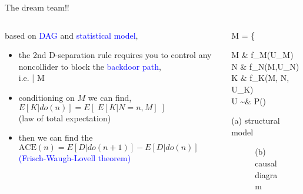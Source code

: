 %
%
\begin{frame}
	{The dream team!!}
	\begin{columns}
		\begin{column}{0.5\textwidth}
			based on \textcolor{blue}{DAG} and \textcolor{blue}{statistical model},
			\begin{itemize}
				\item the 2nd D-separation rule requires you to control any noncollider to block the \textcolor{blue}{backdoor path}, \\
				i.e.  \; | M \\
				\item conditioning on $M$ we can find, \\
				{\small $E[K | do(n)] = E[\; E[K | N=n, M] \;]$} \\
				{\small (law of total expectation)}
				\item then we can find the \\
				{\small $\text{ACE}(n) = E[D | do(n+1)] - E[D | do(n)]$ } \\
				{\small \textcolor{blue}{(Frisch-Waugh-Lovell theorem)} }
			\end{itemize}
		\end{column}
		\begin{column}{0.5\textwidth}  
			\begin{equ}
				M = \left\{ \begin{aligned} 
					M \leftarrow & \; f_{M}(U_{M}) \\
					N \leftarrow & \; f_{N}(M,U_{N}) \\
					K \leftarrow & \; f_{K}(M, N, U_{K}) \\
					U \sim & \; P()
				\end{aligned} \right
				\caption*{(a) structural model}
			\end{equ}
			\begin{figure}
				\caption*{(b) causal diagram}
			\end{figure}
		\end{column}
	\end{columns}
\end{frame}
